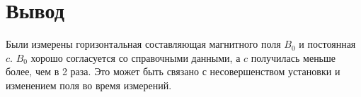 \section{Вывод}
Были измерены горизонтальная составляющая магнитного поля $B_{0}$ и постоянная $c$. $B_{0}$ хорошо согласуется со справочными данными, а $c$ получилась меньше более, чем в 2 раза. Это может быть связано с несовершенством установки и изменением поля во время измерений.
